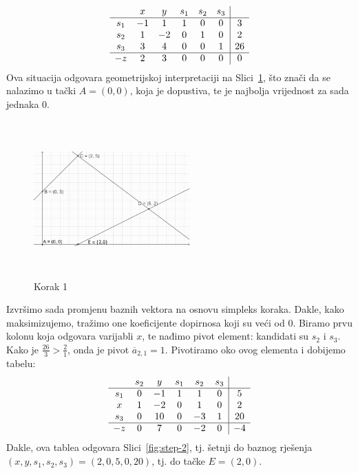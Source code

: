 \documentclass[a4paper, utf8, 11pt, colorlinks]{book}
\begin{document}
$$\begin{array}{cccccc| c}
        & x & y & s_1 & s_2 & s_3 & \\ \hline
   s_1  & -1 & 1 & 1 & 0 & 0 & 3 \\
   s_2  & 1 & -2 & 0 & 1 & 0 & 2 \\
   s_3  & 3 & 4 & 0 & 0 & 1 & 26 \\ \hline
    -z  & 2 & 3 & 0 & 0 & 0 & 0 \\
\end{array}
$$ 
Ova situacija odgovara   geometrijskoj interpretaciji na Slici~\ref{fig:step-1}, što znači da se nalazimo u tački $A=(0,0)$, koja je dopustiva, te je najbolja vrijednost za sada jednaka 0. 
\begin{figure}[H]
	\centering
	\includegraphics[width=170pt, height=170pt]{simpleks-primjer-2-sl1.eps}
	\caption{Korak 1}
	\label{fig:step-1}
\end{figure}

Izvršimo sada promjenu baznih vektora na osnovu simpleks koraka. Dakle, kako maksimizujemo, 
tražimo one koeficijente dopirnosa koji su veći od 0. Biramo prvu kolonu koja odgovara varijabli $x$, te nađimo 
pivot element: kandidati su $s_2$ i $s_3$. Kako je $\frac{26}{3} > \frac{2}{1}$, onda je  pivot $\overline{a}_{2, 1} = 1$. Pivotiramo oko ovog elementa i dobijemo tabelu:
$$\begin{array}{cccccc| c}
       & s_2  & y  & s_1  & s_2 & s_3 &    \\ \hline
   s_1 & 0    & -1  & 1  & 1 & 0  &  5     \\
   x   & 1    & -2  & 0  & 1 & 0  &  2     \\
   s_3 & 0    & 10   &  0  & -3 & 1 & 20   \\ \hline
   -z  & 0    &  7   & 0   & -2 & 0 & -4   \\ 
\end{array}
$$ 
Dakle, ova tablea odgovara Slici~\ref{fig:step-2}, tj. šetnji do baznog rješenja $(x,y, s_1, s_2, s_3)=(2, 0, 5, 0 ,20)$, tj. do tačke $E=(2, 0)$. 
\end{document}
